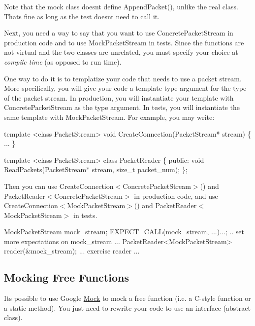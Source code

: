 Note that the mock class doesn\textquotesingle{}t define {\ttfamily Append\+Packet()}, unlike the real class. That\textquotesingle{}s fine as long as the test doesn\textquotesingle{}t need to call it.

Next, you need a way to say that you want to use {\ttfamily Concrete\+Packet\+Stream} in production code and to use {\ttfamily Mock\+Packet\+Stream} in tests. Since the functions are not virtual and the two classes are unrelated, you must specify your choice at {\itshape compile time} (as opposed to run time).

One way to do it is to templatize your code that needs to use a packet stream. More specifically, you will give your code a template type argument for the type of the packet stream. In production, you will instantiate your template with {\ttfamily Concrete\+Packet\+Stream} as the type argument. In tests, you will instantiate the same template with {\ttfamily Mock\+Packet\+Stream}. For example, you may write\+:


\begin{DoxyCode}
\textcolor{keyword}{template} <\textcolor{keyword}{class} PacketStream>
\textcolor{keywordtype}{void} CreateConnection(PacketStream* stream) \{ ... \}

\textcolor{keyword}{template} <\textcolor{keyword}{class} PacketStream>
\textcolor{keyword}{class }PacketReader \{
 \textcolor{keyword}{public}:
  \textcolor{keywordtype}{void} ReadPackets(PacketStream* stream, \textcolor{keywordtype}{size\_t} packet\_num);
\};
\end{DoxyCode}


Then you can use {\ttfamily Create\+Connection$<$Concrete\+Packet\+Stream$>$()} and {\ttfamily Packet\+Reader$<$Concrete\+Packet\+Stream$>$} in production code, and use {\ttfamily Create\+Connection$<$Mock\+Packet\+Stream$>$()} and {\ttfamily Packet\+Reader$<$Mock\+Packet\+Stream$>$} in tests.


\begin{DoxyCode}
MockPacketStream mock\_stream;
EXPECT\_CALL(mock\_stream, ...)...;
.. \textcolor{keyword}{set} more expectations on mock\_stream ...
PacketReader<MockPacketStream> reader(&mock\_stream);
... exercise reader ...
\end{DoxyCode}


\subsection*{Mocking Free Functions}

It\textquotesingle{}s possible to use Google \hyperlink{classMock}{Mock} to mock a free function (i.\+e. a C-\/style function or a static method). You just need to rewrite your code to use an interface (abstract class).

